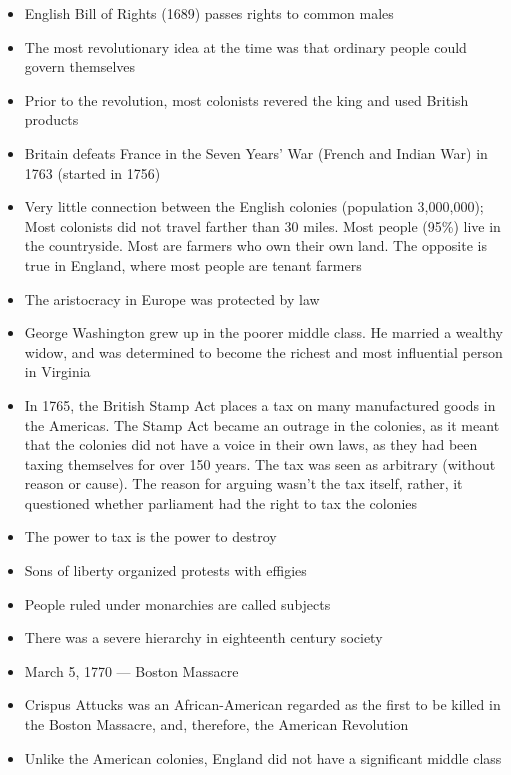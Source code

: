\documentclass[12pt]{article}
\begin{document}
\begin{itemize}
  \item English Bill of Rights (1689) passes rights to common males

  \item The most revolutionary idea at the time was that ordinary people could govern themselves

  \item Prior to the revolution, most colonists revered the king and used British products

  \item Britain defeats France in the Seven Years' War (French and Indian War) in 1763 (started in 1756)

  \item Very little connection between the English colonies (population 3,000,000); Most colonists did not travel farther than 30 miles. Most people (95\%) live in the countryside. Most are farmers who own their own land. The opposite is true in England, where most people are tenant farmers

  \item The aristocracy in Europe was protected by law

  \item George Washington grew up in the poorer middle class. He married a wealthy widow, and was determined to become the richest and most influential person in Virginia

  \item In 1765, the British Stamp Act places a tax on many manufactured goods in the Americas. The Stamp Act became an outrage in the colonies, as it meant that the colonies did not have a voice in their own laws, as they had been taxing themselves for over 150 years. The tax was seen as arbitrary (without reason or cause). The reason for arguing wasn't the tax itself, rather, it questioned whether parliament had the right to tax the colonies

  \item The power to tax is the power to destroy

  \item Sons of liberty organized protests with effigies

  \item People ruled under monarchies are called subjects

  \item There was a severe hierarchy in eighteenth century society

  \item March 5, 1770 — Boston Massacre

  \item Crispus Attucks was an African-American regarded as the first to be killed in the Boston Massacre, and, therefore, the American Revolution

  \item Unlike the American colonies, England did not have a significant middle class

\end{itemize}
\end{document}
